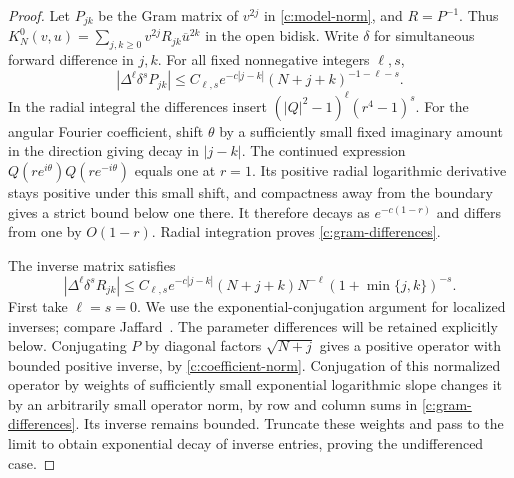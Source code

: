 \documentclass[11pt]{article}
\numberwithin{equation}{section}
\theoremstyle{definition}\newtheorem{definition}[theorem]{Definition}
\theoremstyle{remark}\newtheorem{remark}[theorem]{Remark}
\begin{document}
\begin{proof}
Let $P_{jk}$ be the Gram matrix of $v^{2j}$ in
\eqref{c:model-norm}, and $R=P^{-1}$.  Thus
$K_N^0(v,u)=\sum_{j,k\ge0}v^{2j}R_{jk}\overline u^{2k}$ in the
open bidisk.  Write $\delta$ for simultaneous forward difference in
$j,k$.  For all fixed nonnegative integers $\ell,s$,
\begin{equation}\label{c:gram-differences}
 |\Delta^\ell\delta^sP_{jk}|
 \le C_{\ell,s}e^{-c|j-k|}(N+j+k)^{-1-\ell-s}.
\end{equation}
In the radial integral the differences insert
$(|Q|^2-1)^\ell(r^4-1)^s$.  For the angular Fourier coefficient,
shift $\theta$ by a sufficiently small fixed imaginary amount in the
direction giving decay in $|j-k|$.  The continued expression
$Q(re^{i\theta})Q(re^{-i\theta})$ equals one at $r=1$.
Its positive radial logarithmic derivative stays positive under this
small shift, and compactness away from the boundary gives a strict
bound below one there.  It therefore decays as $e^{-c(1-r)}$ and
differs from one by $O(1-r)$.  Radial integration proves
\eqref{c:gram-differences}.

The inverse matrix satisfies
\begin{equation}\label{c:inverse-gram-differences}
 |\Delta^\ell\delta^sR_{jk}|
 \le C_{\ell,s}e^{-c|j-k|}(N+j+k)N^{-\ell}
                   (1+\min\{j,k\})^{-s}.
\end{equation}
First take $\ell=s=0$.  We use the exponential-conjugation argument
for localized inverses; compare Jaffard~\cite[Proposition 2]{Jaffard1990}.
The parameter differences will be retained explicitly below.
Conjugating $P$ by diagonal factors
$\sqrt{N+j}$ gives a positive operator with bounded positive inverse,
by \eqref{c:coefficient-norm}.  Conjugation of this normalized operator
by weights of sufficiently small exponential logarithmic slope changes
it by an arbitrarily small operator norm, by row and column sums in
\eqref{c:gram-differences}.  Its inverse remains bounded.  Truncate
these weights and pass to the limit to obtain exponential decay of
inverse entries, proving the undifferenced case.


\end{proof}
\end{document}
